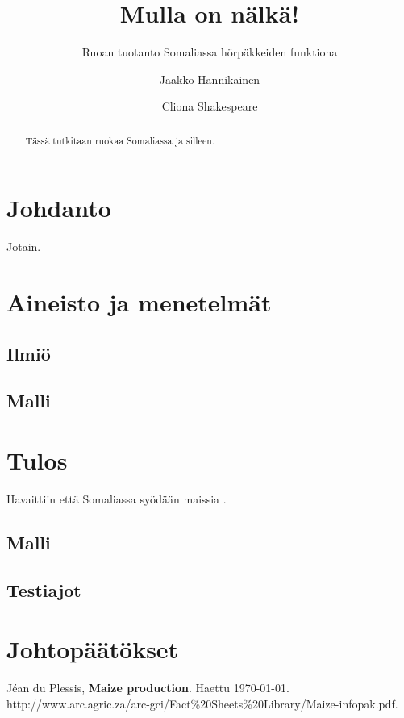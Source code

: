 \documentclass[12pt]{scrreprt}
\title{Mulla on nälkä!}
\subtitle{Ruoan tuotanto Somaliassa hörpäkkeiden funktiona}
\author{Jaakko Hannikainen \and Cliona Shakespeare}
\date{}
\renewcommand\emph{\textbf}
\begin{document}
  \maketitle

  \begin{abstract}
    Tässä tutkitaan ruokaa Somaliassa ja silleen.
  \end{abstract}

  \tableofcontents

  \chapter{Johdanto}

  Jotain.

  \chapter{Aineisto ja menetelmät}

  \section{Ilmiö}

  \section{Malli}

  \chapter{Tulos}
  Havaittiin että Somaliassa syödään maissia \cite{maize}.

  \section{Malli}

  \section{Testiajot}

  \chapter{Johtopäätökset}

  \begin{thebibliography}{9}

    Jéan du Plessis,
    \emph{Maize production}.
    Haettu \today. \\
    http://www.arc.agric.za/arc-gci/Fact\%20Sheets\%20Library/Maize-infopak.pdf.

  \end{thebibliography}
\end{document}
